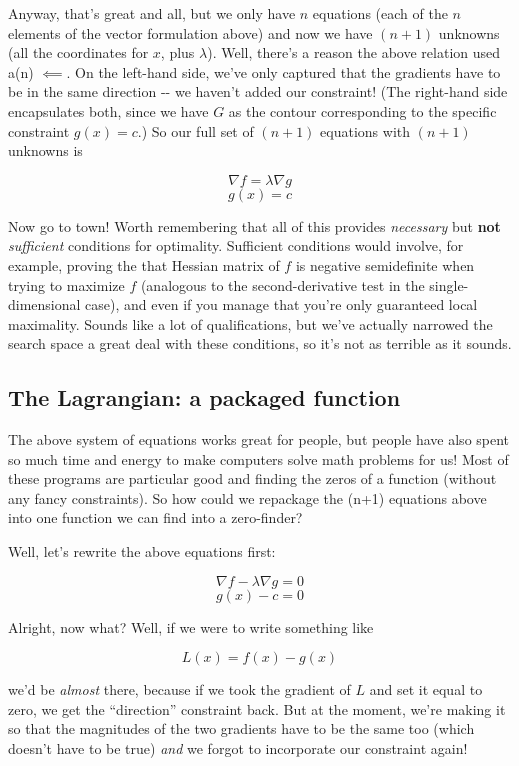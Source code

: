 \documentclass[letterpaper,12pt]{report}
\begin{document}
Anyway, that's great and all, but we only have \(n\) equations (each of
the \(n\) elements of the vector formulation above) and now we have
\((n+1)\) unknowns (all the coordinates for \(x\), plus \(\lambda\)).
Well, there's a reason the above relation used a(n) \(\impliedby\). On
the left-hand side, we've only captured that the gradients have to be in
the same direction -\/- we haven't added our constraint! (The right-hand
side encapsulates both, since we have \(G\) as the contour corresponding
to the specific constraint \(g(x) = c\).) So our full set of \((n+1)\)
equations with \((n+1)\) unknowns is

\[\nabla f = \lambda \nabla g \] \[g(x) = c\]

Now go to town! Worth remembering that all of this provides
\emph{necessary} but \textbf{not} \emph{sufficient} conditions for
optimality. Sufficient conditions would involve, for example, proving
the that Hessian matrix of \(f\) is negative semidefinite when trying to
maximize \(f\) (analogous to the second-derivative test in the
single-dimensional case), and even if you manage that you're only
guaranteed local maximality. Sounds like a lot of qualifications, but
we've actually narrowed the search space a great deal with these
conditions, so it's not as terrible as it sounds.

\label{sec:the-lagrangian-a-packaged-function}
\subsection{The Lagrangian: a packaged function} 

The above system of equations works great for people, but people have
also spent so much time and energy to make computers solve math problems
for us! Most of these programs are particular good and finding the zeros
of a function (without any fancy constraints). So how could we repackage
the (n+1) equations above into one function we can find into a
zero-finder?

Well, let's rewrite the above equations first:

\[\nabla f - \lambda \nabla g = 0\] \[g(x) - c = 0\]

Alright, now what? Well, if we were to write something like

\[ L(x) = f(x) - g(x) \]

we'd be \emph{almost} there, because if we took the gradient of \(L\)
and set it equal to zero, we get the ``direction'' constraint back. But at
the moment, we're making it so that the magnitudes of the two gradients
have to be the same too (which doesn't have to be true) \emph{and} we
forgot to incorporate our constraint again!
\end{document}
